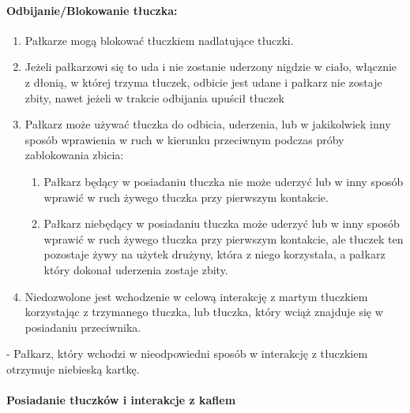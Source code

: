 \documentclass[12pt]{article}
\newcommand\bluecard{\bgroup\color{blue}\markoverwith{\textcolor{blue}{\rule[-0.5ex]{2pt}{0.4pt}}}\ULon}
\begin{document}
\paragraph{Odbijanie/Blokowanie tłuczka:}

\begin{enumerate}
	\item
	      Pałkarze mogą blokować tłuczkiem nadlatujące tłuczki.
	\item
	      Jeżeli pałkarzowi się to uda i nie zostanie uderzony nigdzie w ciało,
	      włącznie z dłonią, w której trzyma tłuczek, odbicie jest udane i
	      pałkarz nie zostaje zbity, nawet jeżeli w trakcie odbijania upuścił
	      tłuczek
	\item
	      Pałkarz może używać tłuczka do odbicia, uderzenia, lub w jakikolwiek
	      inny sposób wprawienia w ruch w kierunku przeciwnym podczas próby
	      zablokowania zbicia:

	      \begin{enumerate}
		      \item
		            Pałkarz będący w posiadaniu tłuczka nie może uderzyć lub w inny
		            sposób wprawić w ruch żywego tłuczka przy pierwszym kontakcie.
		      \item
		            Pałkarz niebędący w posiadaniu tłuczka może uderzyć lub w inny
		            sposób wprawić w ruch żywego tłuczka przy pierwszym kontakcie, ale
		            tłuczek ten pozostaje żywy na użytek drużyny, która z niego
		            korzystała, a pałkarz który dokonał uderzenia zostaje zbity.
	      \end{enumerate}
	\item
	      Niedozwolone jest wchodzenie w celową interakcję z martym tłuczkiem
	      korzystając z trzymanego tłuczka, lub tłuczka, który wciąż znajduje
	      się w posiadaniu przeciwnika.
\end{enumerate}

\bluecard{Niebieska kartka} - Pałkarz, który wchodzi w nieodpowiedni sposób
w interakcję z tłuczkiem otrzymuje niebieską kartkę.

\paragraph{Posiadanie tłuczków i interakcje z kaflem}
\end{document}
